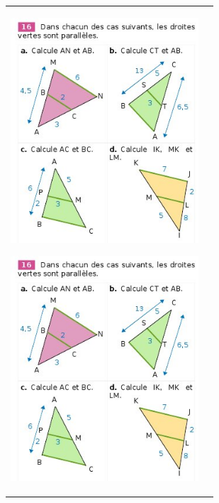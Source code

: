\documentclass[12pt, twoside]{article}
\begin{document}
\begin{tabular}{cc}
\begin{minipage}{9cm}
\includegraphics[width=7cm]{images/ex16.jpg}

\enskip

\includegraphics[width=7cm]{images/ex16.jpg}


\enskip


\end{minipage}
\end{tabular}
\end{document}
